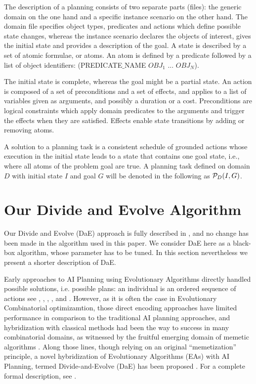 \documentclass{acm_proc_article-sp}
\begin{document}
The description of a planning consists of two separate parts (files): the generic domain on the one hand and a specific instance scenario on the other hand. The domain file specifies object types, predicates and actions which define possible state changes, whereas the instance scenario declares the objects of interest, gives the initial state and provides a description of the goal. A state is described by a set of atomic formulae, or atoms. An atom is defined by a predicate followed by a list of object identifiers: (PREDICATE$\_$NAME $OBJ_1$ ... $OBJ_N$). 

The initial state is complete, whereas the goal might be a partial state. An action is composed of a set of preconditions and a set of effects, and applies to a list of variables given as arguments, and possibly a duration or a cost. Preconditions are logical constraints which apply domain predicates to the arguments and trigger the effects when they are satisfied. Effects enable state transitions by adding or removing atoms.

A solution to a planning task is a consistent schedule of grounded actions whose execution in the initial state leads to a state that contains one goal state, i.e., where all atoms of the problem goal are true. A planning task defined on domain $D$ with initial state $I$ and goal $G$ will be denoted in the following as ${\cal P}_D(I,G)$.

\section{Our Divide and Evolve Algorithm}
\label{section:dae}

Our Divide and Evolve (DaE) approach is fully described in \cite{BibEvoCop:2010}, and no change has been made in the algorithm used in this paper. We consider DaE here as a black-box algorithm, whose parameter has to be tuned. In this section nevertheless we present a shorter description of DaE.

Early approaches to AI Planning using Evolutionary Algorithms directly handled possible solutions, i.e. possible plans: an individual is an ordered sequence of actions see \cite{Spector-AAAI-94}, \cite{muslea97}, \cite{westerberg:2000}, \cite{westerberg:2001}, and \cite{Morignot-2005}. However, as it is often the case in Evolutionary Combinatorial optimizamtion, those direct encoding approaches have limited performance in comparison to the traditional AI planning approaches, and hybridization with classical methods had been the way to success in many combinatorial domains, as witnessed by the fruitful emerging domain of memetic algorithms \cite{MemeticBook:2005}. Along those lines, though relying on an original ``memetization'' principle, a novel hybridization of Evolutionary Algorithms (EAs) with AI Planning, termed Divide-and-Evolve (DaE) has been proposed \cite{DAE:EvoCOP06} \cite{DAE:book-2007}. For a complete formal description, see \cite{Bibai:ICAPS2010}.
\end{document}
